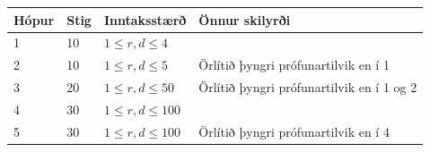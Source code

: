 \begin{tabular}{| l | l | l | l |}
\hline
Hópur & Stig       & Inntaksstærð          & Önnur skilyrði\\ \hline
1     & 10         & $1 \leq r,d \leq 4$   & \\ \hline
2     & 10         & $1 \leq r,d \leq 5$   & Örlítið þyngri prófunartilvik en í 1 \\ \hline
3     & 20         & $1 \leq r,d \leq 50$  & Örlítið þyngri prófunartilvik en í 1 og 2 \\ \hline
4     & 30         & $1 \leq r,d \leq 100$ & \\ \hline
5     & 30         & $1 \leq r,d \leq 100$ & Örlítið þyngri prófunartilvik en í 4\\ \hline
\end{tabular}
